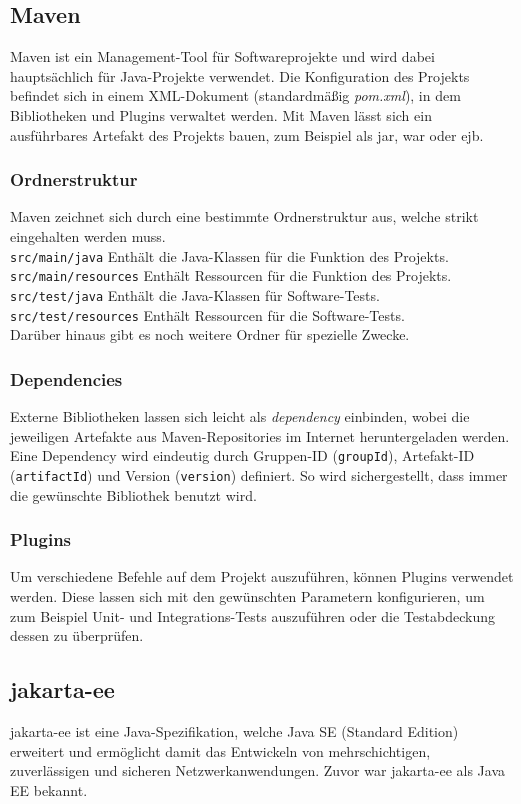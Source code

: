 \documentclass[12pt,twoside,a4paper]{article}
\begin{document}
\begin{sloppypar}
\subsection{Maven}
Maven ist ein Management-Tool für Softwareprojekte und wird dabei hauptsächlich für Java-Projekte verwendet. Die Konfiguration des Projekts befindet sich in einem XML-Dokument (standardmäßig \textit{pom.xml}), in dem Bibliotheken und Plugins verwaltet werden. Mit Maven lässt sich ein ausführbares Artefakt des Projekts bauen, zum Beispiel als \acrfull{jar}, \acrfull{war} oder \acrfull{ejb}.\newline\cite{maven-packaging}
\subsubsection{Ordnerstruktur}
Maven zeichnet sich durch eine bestimmte Ordnerstruktur aus, welche strikt eingehalten werden muss.\\
\texttt{src/main/java} Enthält die Java-Klassen für die Funktion des Projekts.\\
\texttt{src/main/resources} Enthält Ressourcen für die Funktion des Projekts.\\
\texttt{src/test/java} Enthält die Java-Klassen für Software-Tests.\\
\texttt{src/test/resources} Enthält Ressourcen für die Software-Tests.\\
Darüber hinaus gibt es noch weitere Ordner für spezielle Zwecke.\newline\cite{maven-dir-layout}
\subsubsection{Dependencies}
Externe Bibliotheken lassen sich leicht als \textit{dependency} einbinden, wobei die jeweiligen Artefakte aus Maven-Repositories im Internet heruntergeladen werden. Eine Dependency wird eindeutig durch Gruppen-ID (\texttt{groupId}), Artefakt-ID (\texttt{artifactId}) und Version (\texttt{version}) definiert. So wird sichergestellt, dass immer die gewünschte Bibliothek benutzt wird.
\subsubsection{Plugins}
Um verschiedene Befehle auf dem Projekt auszuführen, können Plugins verwendet werden. Diese lassen sich mit den gewünschten Parametern konfigurieren, um zum Beispiel Unit- und Integrations-Tests auszuführen oder die Testabdeckung dessen zu überprüfen.
\subsection{\acrshort{jakarta-ee}}\label{sec:jakarta-ee}
\acrfull{jakarta-ee} ist eine Java-Spezifikation, welche Java SE (Standard Edition) erweitert und ermöglicht damit das Entwickeln von mehrschichtigen, zuverlässigen und sicheren Netzwerkanwendungen. Zuvor war \acrshort{jakarta-ee} als Java EE bekannt.\newline\cite{java-ee}

\end{sloppypar}
\end{document}
